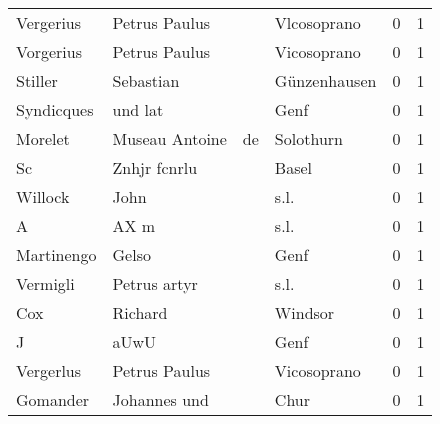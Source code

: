 \begin{center}
\begin{tiny}
\begin{longtabu}{llllrr}
                Vergerius &                      Petrus Paulus &             &                                 Vlcosoprano &          0 &         1 \\
                Vorgerius &                      Petrus Paulus &             &                                 Vicosoprano &          0 &         1 \\
                  Stiller &                          Sebastian &             &                                Günzenhausen &          0 &         1 \\
               Syndicques &                            und lat &             &                                        Genf &          0 &         1 \\
                  Morelet &                     Museau Antoine &          de &                                   Solothurn &          0 &         1 \\
                       Sc &                       Znhjr fcnrlu &             &                                       Basel &          0 &         1 \\
                  Willock &                               John &             &                                        s.l. &          0 &         1 \\
                        A &                               AX m &             &                                        s.l. &          0 &         1 \\
               Martinengo &                              Gelso &             &                                        Genf &          0 &         1 \\
                 Vermigli &                       Petrus artyr &             &                                        s.l. &          0 &         1 \\
                      Cox &                            Richard &             &                                     Windsor &          0 &         1 \\
                        J &                               aUwU &             &                                        Genf &          0 &         1 \\
                Vergerlus &                      Petrus Paulus &             &                                 Vicosoprano &          0 &         1 \\
                 Gomander &                       Johannes und &             &                                        Chur &          0 &         1 \\

\end{longtabu}
\end{tiny}
\end{center}
